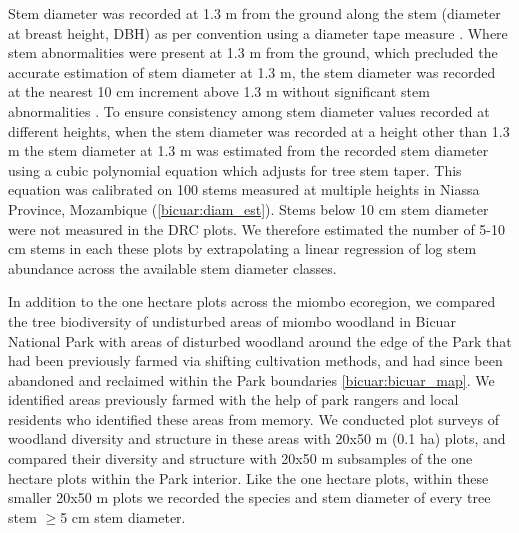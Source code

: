 \begin{refsection}
Stem diameter was recorded at 1.3 m from the ground along the stem (diameter at breast height, DBH) as per convention using a diameter tape measure \citep{Kershaw2017}. Where stem abnormalities were present at 1.3 m from the ground, which precluded the accurate estimation of stem diameter at 1.3 m, the stem diameter was recorded at the nearest 10 cm increment above 1.3 m without significant stem abnormalities \citep{Kershaw2017}. To ensure consistency among stem diameter values recorded at different heights, when the stem diameter was recorded at a height other than 1.3 m the stem diameter at 1.3 m was estimated from the recorded stem diameter using a cubic polynomial equation which adjusts for tree stem taper. This equation was calibrated on 100 stems measured at multiple heights in Niassa Province, Mozambique (\autoref{bicuar:diam_est}). Stems below 10 cm stem diameter were not measured in the DRC plots. We therefore estimated the number of 5-10 cm stems in each these plots by extrapolating a linear regression of log stem abundance across the available stem diameter classes.

In addition to the one hectare plots across the miombo ecoregion, we compared the tree biodiversity of undisturbed areas of miombo woodland in Bicuar National Park with areas of disturbed woodland around the edge of the Park that had been previously farmed via shifting cultivation methods, and had since been abandoned and reclaimed within the Park boundaries \autoref{bicuar:bicuar_map}. We identified areas previously farmed with the help of park rangers and local residents who identified these areas from memory. We conducted \ndegradplots{} plot surveys of woodland diversity and structure in these areas with 20x50 m (0.1 ha) plots, and compared their diversity and structure with 20x50 m subsamples of the \nplotsbicuar{} one hectare plots within the Park interior. Like the one hectare plots, within these smaller 20x50 m plots we recorded the species and stem diameter of every tree stem $\ge$5 cm stem diameter.


\end{refsection}
